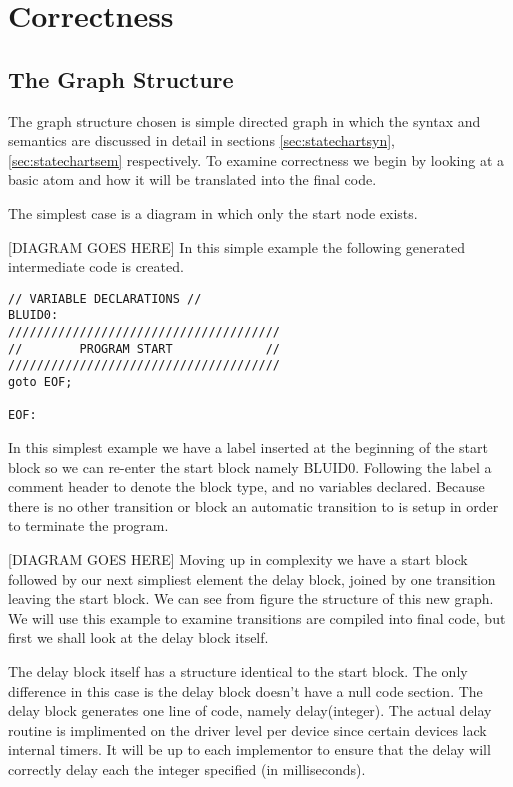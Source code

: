 \section{Correctness}
\subsection{The Graph Structure}
The graph structure chosen is simple directed graph in which the syntax and semantics are discussed in detail in sections \ref{sec:statechartsyn}, \ref{sec:statechartsem} respectively. To examine correctness we begin by looking at a basic atom and how it will be translated into the final code.

The simplest case is a diagram in which only the start node exists.

[DIAGRAM GOES HERE]
In this simple example the following generated intermediate code  is created.

\begin{lstlisting}
// VARIABLE DECLARATIONS //
BLUID0:
//////////////////////////////////////
//        PROGRAM START             //
//////////////////////////////////////
goto EOF;

EOF:
\end{lstlisting}

In this simplest example we have a label inserted at the beginning of the start block so we can re-enter the start block namely BLUID0. Following the label a comment header to denote the block type, and no variables declared.  Because there is no other transition or block an automatic transition to  is setup in order to terminate the program.

[DIAGRAM GOES HERE]
Moving up in complexity we have a start block followed by our next simpliest element the delay block, joined by one transition leaving the start block. We can see from figure %
the structure of this new graph. We will use this example to examine transitions are compiled into final code, but first we shall look at the delay block itself.

The delay block itself has a structure identical to the start block. The only difference in this case is the delay block doesn't have a null code section. The delay block generates one line of code, namely delay(integer). The actual delay routine is implimented on the driver level per device since certain devices lack internal timers. It will be up to each implementor to ensure that the delay will correctly delay each the integer specified (in milliseconds). 

